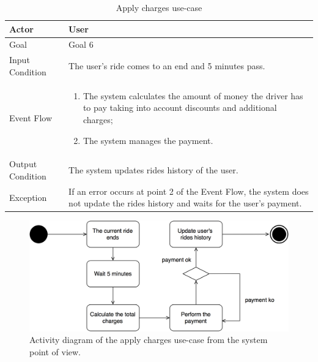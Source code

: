 \begin{table}[H]
\begin{center}
\begin{tabular}{p{} | p{}}
\hline
Actor & User\\
\hline
Goal & Goal 6\\
\hline
Input Condition & The user's ride comes to an end and 5 minutes pass.\\
\hline
Event Flow & 
\begin{enumerate}
\item The system calculates the amount of money the driver has to pay taking into account discounts and additional charges;
\item The system manages the payment.
\end{enumerate} \\
\hline
Output Condition & The system updates rides history of the user.\\
\hline
Exception & If an error occurs at point 2 of the Event Flow, the system does not update the rides history and waits for the user's payment.\\
\hline
\end{tabular}
\end{center}
\caption{Apply charges use-case}
\label{apply_charges_uc}
\end{table}

\begin{figure}[H]
\begin{center}
		\includegraphics[width=\textwidth]{./specific_requirements/features/diagrams/apply_charges_activity.png}
		\caption{Activity diagram of the apply charges use-case from the system point of view.}
		\label{app_charges_act}
\end{center}
\end{figure}